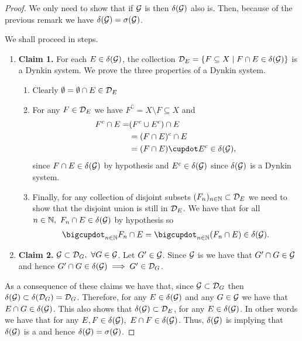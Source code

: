 \begin{proof}
	We only need to show that if $\mathcal{G}$ is \istable then $\delta(\mathcal{G})$ also is. Then, because of the previous remark we have $\delta(\mathcal{G}) = \sigma(\mathcal{G})$.
	
	We shall proceed in steps.
	\begin{enumerate}
		\item \textbf{Claim 1.} For each $E \in \delta(\mathcal{G})$, the collection $\mathcal{D}_E = \{ F \subseteq X \mid F \cap E \in \delta(\mathcal{G})\}$ is a Dynkin system. We prove the three properties of a Dynkin system.
		\begin{enumerate}
			\item Clearly $\emptyset = \emptyset \cap E \in \mathcal{D}_E$
			\item For any $F \in \mathcal{D}_E$ we have $F^\complement = X \setminus F \subseteq X$ and
			\begin{align*}
				 F^\complement \cap E =& (F^\complement \cup E^\complement) \cap E \\
				 &= (F \cap E)^\complement \cap E \\
				 &= (F \cap E) \cupdot E^\complement \in \delta(\calG),
			\end{align*}
			since $F \cap E \in \delta(\mathcal{G})$ by hypothesis and $E^c \in \delta(\mathcal{G})$ since $\delta(\mathcal{G})$ is a Dynkin system.
			\item Finally, for any collection of disjoint subsets $(F_n)_{n\in\mathbb{N}} \subset \mathcal{D}_E$ we need to show that the disjoint union is still in $\mathcal{D}_E$. We have that for all $n \in \mathbb{N},\ F_n \cap E \in \delta(\mathcal{G})$ by hypothesis so
			\begin{align*}
				\bigcupdot_{n \in \N} F_n \cap E = \bigcupdot_{n\in\N} (F_n \cap E) \in \delta(\calG).
			\end{align*}
		\end{enumerate}
		\item \textbf{Claim 2.} $\mathcal{G} \subset \mathcal{D}_G,\ \forall G \in \mathcal{G}$. Let $G' \in \mathcal{G}$. Since $\mathcal{G}$ is \istable we have that $G' \cap G \in \mathcal{G}$ and hence $G' \cap G \in \delta(\mathcal{G}) \implies G' \in \mathcal{D}_G$.
	\end{enumerate}

	As a consequence of these claims we have that, since $\mathcal{G} \subset \mathcal{D}_G$ then $\delta(\mathcal{G}) \subset \delta(\mathcal{D}_G) = \mathcal{D}_G$. Therefore, for any $E \in \delta(\mathcal{G})$ and any $G \in \mathcal{G}$ we have that $E \cap G \in \delta(\mathcal{G})$. This also shows that $\delta(\mathcal{G}) \subset \mathcal{D}_E$, for any $E \in \delta(\mathcal{G})$. In other words we have that for any $E, F \in \delta(\calG),\ E \cap F \in \delta(\calG)$. Thus, $\delta(\mathcal{G})$ is \istable implying that $\delta(\mathcal{G})$ is a \siga and hence $\delta(\mathcal{G}) = \sigma(\mathcal{G})$.
\end{proof}

